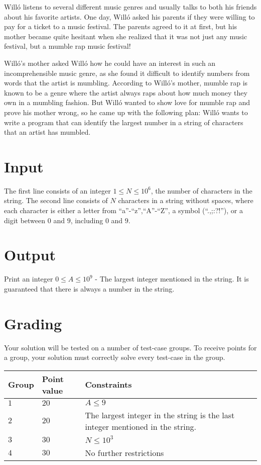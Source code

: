 \noindent
Willó listens to several different music genres and usually talks to both his friends about his favorite artists. 
One day, Willó asked his parents if they were willing to pay for a ticket to a music festival. 
The parents agreed to it at first, but his mother became quite hesitant when she realized that it was not just any music festival, but a mumble rap music festival!

\noindent
Willó's mother asked Willó how he could have an interest in such an incomprehensible music genre, as she found it difficult to identify numbers from words that the artist is mumbling. 
According to Willó's mother, mumble rap is known to be a genre where the artist always raps about how much money they own in a mumbling fashion. 
But Willó wanted to show love for mumble rap and prove his mother wrong, so he came up with the following plan: 
Willó wants to write a program that can identify the largest number in a string of characters that an artist has mumbled.

\section*{Input}
\noindent
The first line consists of an integer $1 \leqslant N \leqslant 10^6$, the number of characters in the string.
The second line consists of $N$ characters in a string without spaces, where each character is either a letter from ``a''-``z'',``A''-``Z'', a symbol (``.,;:?!''), or a digit between $0$ and $9$, including $0$ and $9$.

\section*{Output}
\noindent
Print an integer $0 \leqslant A \leqslant 10^9$ - The largest integer mentioned in the string. It is guaranteed that there is always a number in the string.


\section*{Grading}
\noindent
Your solution will be tested on a number of test-case groups.
To receive points for a group, your solution must correctly solve every test-case in the group.

\noindent
\begin{tabular}{| l | l | l |}
\hline
  Group & Point value & Constraints \\ \hline
  $1$    & $20$       &  $A \leqslant 9$ \\ \hline
  $2$    & $20$       &  The largest integer in the string is the last integer mentioned in the string. \\ \hline
  $3$    & $30$       &  $N \leqslant 10^3$ \\ \hline
  $4$    & $30$       &  No further restrictions \\ \hline
\end{tabular}

